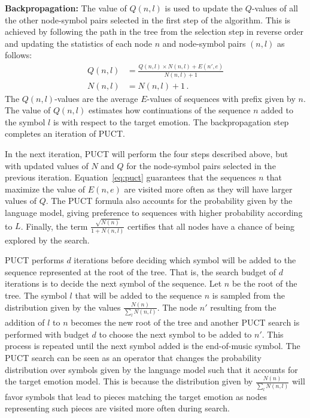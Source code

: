 \vspace{0.1in}
\noindent
\textbf{Backpropagation:} The value of $Q(n, l)$ is used to update the $Q$-values of all the other node-symbol pairs selected in the first step of the algorithm. This is achieved by following the path in the tree from the selection step in reverse order and updating the statistics of each node $n$ and node-symbol pairs $(n, l)$ as follows:
\begin{align*}
Q(n, l) &= \frac{Q(n, l) \times N(n, l) + E(n', e)}{N(n, l) + 1} \\
N(n, l) &= N(n, l) + 1 \,.
\end{align*}
The $Q(n, l)$-values are the average $E$-values of sequences with prefix given by $n$. The value of $Q(n, l)$ estimates how continuations of the sequence $n$ added to the symbol $l$ is with respect to the target emotion. The backpropagation step completes an iteration of PUCT.

In the next iteration, PUCT will perform the four steps described above, but with updated values of $N$ and $Q$ for the node-symbol pairs selected in the previous iteration. Equation~\ref{eq:puct} guarantees that the sequences $n$ that maximize the value of $E(n, e)$ are visited more often as they will have larger values of $Q$. The PUCT formula also accounts for the probability given by the language model, giving preference to sequences with higher probability according to $L$. Finally, the term $\frac{\sqrt{N(n)}}{1 + N(n, l)}$ certifies that all nodes have a chance of being explored by the search.

PUCT performs $d$ iterations before deciding which symbol will be added to the sequence represented at the root of the tree. That is, the search budget of $d$ iterations is to decide the next symbol of the sequence. Let $n$ be the root of the tree. The symbol $l$ that will be added to the sequence $n$ is sampled from the distribution given by the values $\frac{N(n)}{\sum_{l} N(n, l)}$. The node $n'$ resulting from the addition of $l$ to $n$ becomes the new root of the tree and another PUCT search is performed with budget $d$ to choose the next symbol to be added to $n'$. This process is repeated until the next symbol added is the end-of-music symbol. The PUCT search can be seen as an operator that changes the probability distribution over symbols given by the language model such that it accounts for the target emotion model. This is because the distribution given by $\frac{N(n)}{\sum_{l} N(n, l)}$ will favor symbols that lead to pieces matching the target emotion as nodes representing such pieces are visited more often during search.

